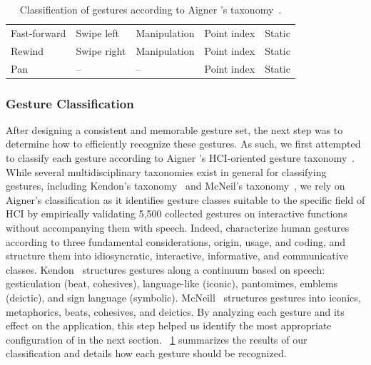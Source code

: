 \begin{table}[bt]
\begin{tabular}{lll|ll}
        Fast-forward & Swipe left & \cellcolor{manipulation} Manipulation & Point index & Static \\
        Rewind & Swipe right & \cellcolor{manipulation} Manipulation & Point index & Static \\
        Pan & -- & -- & Point index & Static \\
        \bottomrule
    \end{tabular}
    \vspace{-4pt}
    \caption{Classification of \lui gestures according to Aigner \etal's taxonomy~\cite{Aigner:2012}.}
    \label{tab:lui:elicitation-to-recognition}
\end{table}

\subsubsection{Gesture Classification} %
After designing a consistent and memorable gesture set, the next step was to determine how to efficiently recognize these gestures. As such, we first attempted to classify each gesture according to Aigner \etal's HCI-oriented gesture taxonomy~\cite{Aigner:2012}. While several multidisciplinary taxonomies exist in general for classifying gestures, including Kendon's taxonomy~\cite{Kendon:1988} and McNeil's taxonomy~\cite{McNeill:1995}, we rely on Aigner's classification as it identifies gesture classes suitable to the specific field of HCI by empirically validating 5,500 collected gestures on interactive functions without accompanying them with speech. Indeed, \cite{Ekman:1969} characterize human gestures according to three fundamental considerations, \ie origin, usage, and coding, and structure them into idiosyncratic, interactive, informative, and communicative classes.
Kendon~\cite{Kendon:1988} structures gestures along a continuum based on speech: gesticulation (beat, cohesives), language-like
(iconic), pantomimes, emblems (deictic), and sign language
(symbolic). McNeill~\cite{McNeill:1995} structures gestures into iconics, metaphorics, beats, cohesives, and deictics. 
By analyzing each gesture and its effect on the application, this step helped us identify the most appropriate configuration of \ql in the next section. \tab~\ref{tab:lui:elicitation-to-recognition} summarizes the results of our classification and details how each gesture should be recognized.



